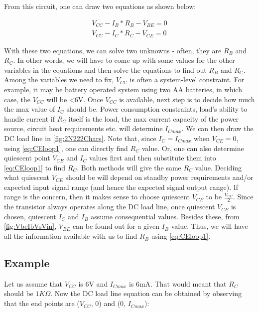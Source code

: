 From this circuit, one can draw two equations as shown below:
           
           \begin{align}
	V_{CC} - I_B*R_B - V_{BE} = 0 \label{eq:BEloop1} \\
 	V_{CC} - I_C*R_C - V_{CE} = 0 \label{eq:CEloop1}
	\end{align}

With these two equations, we can solve two unknowns - often, they are $R_B$ and $R_C$. In other words, we will have to come up with some values for the other variables in the equations and then solve the equations to find out $R_B$ and $R_C$. Among the variables we need to fix, $V_{CC}$ is often a system-level constraint. For example, it may be battery operated system using two AA batteries, in which case, the $V_{CC}$ will be <6V. Once $V_{CC}$ is available, next step is to decide how much the max value of $I_C$ should be. Power consumption constraints, load's ability to handle current if $R_C$ itself is the load, the max current capacity of the power source, circuit heat requirements etc. will determine $I_{Cmax}$. We can then draw the DC load line in \autoref{fig:2N222Chars}. Note that, since $I_C = I_{Cmax}$ when $V_{CE} = 0$, using \autoref{eq:CEloop1}, one can directly find $R_C$ value. Or, one can also determine quiescent point $V_{CE}$ and $I_C$ values first and then substitute them into \autoref{eq:CEloop1} to find $R_C$. Both methods will give the same $R_C$ value. Deciding what quiescent $V_{CE}$ should be will depend on standby power requirements and/or expected input signal range (and hence the expected signal output range). If range is the concern, then it makes sense to choose quiescent $V_{CE}$ to be $\frac{V_{CC}}{2}$. Since the transistor always operates along the DC load line, once quiescent $V_{CE}$ is chosen, quiescent $I_C$ and $I_B$ assume consequential values. Besides these, from \autoref{fig:VbeIbVsVin}, $V_{BE}$ can be found out for a given $I_B$ value. Thus, we will have all the information available with us to find $R_B$ using \autoref{eq:CEloop1}. 

\subsection{Example}
Let us assume that $V_{CC}$ is 6V and $I_{Cmax}$ is 6mA. That would meant that $R_C$ should be $1K\Omega$. Now the DC load line equation can be obtained by observing that the end points are ($V_{CC}$, 0) and (0, $I_{Cmax}$):

